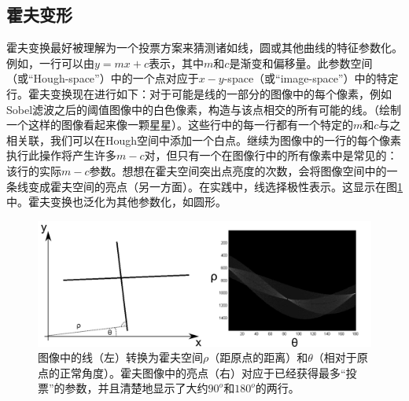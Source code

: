 \subsection{霍夫变形}
霍夫变换最好被理解为一个投票方案来猜测诸如线，圆或其他曲线的特征参数化\cite{duda1972use}。例如，一行可以由$y=mx+c$表示，其中$m$和$c$是渐变和偏移量。此参数空间（或“Hough-space”）中的一个点对应于$x-y$-space（或“image-space”）中的特定行。霍夫变换现在进行如下：对于可能是线的一部分的图像中的每个像素，例如Sobel滤波之后的阈值图像中的白色像素，构造与该点相交的所有可能的线。（绘制一个这样的图像看起来像一颗星星）。这些行中的每一行都有一个特定的$m$和$c$与之相关联，我们可以在Hough空间中添加一个白点。继续为图像中的一行的每个像素执行此操作将产生许多$m-c$对，但只有一个在图像行中的所有像素中是常见的：该行的实际$m-c$参数。想想在霍夫空间突出点亮度的次数，会将图像空间中的一条线变成霍夫空间的亮点（另一方面）。在实践中，线选择极性表示。这显示在图\ref{fig:hough}中。霍夫变换也泛化为其他参数化，如圆形。


\begin{figure}
\center
\includegraphics[width=\textwidth]{figs/houghtransform}
\caption{
图像中的线（左）转换为霍夫空间$\rho$（距原点的距离）和$\theta$（相对于原点的正常角度）。霍夫图像中的亮点（右）对应于已经获得最多“投票”的参数，并且清楚地显示了大约$90^o$和$180^o$的两行。
\label{fig:hough}} 
\end{figure}


